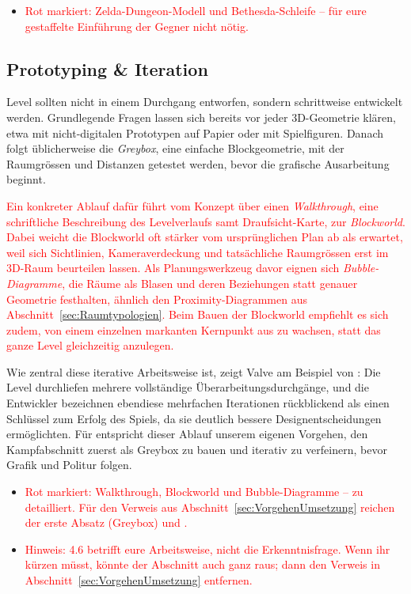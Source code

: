 \documentclass[../Main.tex]{subfiles}
\begin{document}
\begin{itemize}[leftmargin=1.5cm]
    \item \textcolor{red}{Rot markiert: Zelda-Dungeon-Modell und Bethesda-Schleife -- für eure gestaffelte Einführung der Gegner nicht nötig.}
\end{itemize}

\subsection{Prototyping \& Iteration} \label{sec:Prototyping}
Level sollten nicht in einem Durchgang entworfen, sondern schrittweise entwickelt werden. Grundlegende Fragen lassen sich bereits vor jeder 3D-Geometrie klären, etwa mit nicht-digitalen Prototypen auf Papier oder mit Spielfiguren. Danach folgt üblicherweise die \textit{Greybox}, eine einfache Blockgeometrie, mit der Raumgrössen und Distanzen getestet werden, bevor die grafische Ausarbeitung beginnt.\autocite[124--126]{totten2014architectural}

\textcolor{red}{Ein konkreter Ablauf dafür führt vom Konzept über einen \textit{Walkthrough}, eine schriftliche Beschreibung des Levelverlaufs samt Draufsicht-Karte, zur \textit{Blockworld}. Dabei weicht die Blockworld oft stärker vom ursprünglichen Plan ab als erwartet, weil sich Sichtlinien, Kameraverdeckung und tatsächliche Raumgrössen erst im 3D-Raum beurteilen lassen. Als Planungswerkzeug davor eignen sich \textit{Bubble-Diagramme}, die Räume als Blasen und deren Beziehungen statt genauer Geometrie festhalten, ähnlich den Proximity-Diagrammen aus Abschnitt~\ref{sec:Raumtypologien}. Beim Bauen der Blockworld empfiehlt es sich zudem, von einem einzelnen markanten Kernpunkt aus zu wachsen, statt das ganze Level gleichzeitig anzulegen.\autocite{gdc_leveldesignaday2020}}

Wie zentral diese iterative Arbeitsweise ist, zeigt Valve am Beispiel von \autocite{valve_halflife2_2004}: Die Level durchliefen mehrere vollständige Überarbeitungsdurchgänge, und die Entwickler bezeichnen ebendiese mehrfachen Iterationen rückblickend als einen Schlüssel zum Erfolg des Spiels, da sie deutlich bessere Designentscheidungen ermöglichten.\autocite{jacobson2005postmortem} Für  entspricht dieser Ablauf unserem eigenen Vorgehen, den Kampfabschnitt zuerst als Greybox zu bauen und iterativ zu verfeinern, bevor Grafik und Politur folgen.

\begin{itemize}[leftmargin=1.5cm]
    \item \textcolor{red}{Rot markiert: Walkthrough, Blockworld und Bubble-Diagramme -- zu detailliert. Für den Verweis aus Abschnitt~\ref{sec:VorgehenUmsetzung} reichen der erste Absatz (Greybox) und .}
    \item \textcolor{red}{Hinweis: 4.6 betrifft eure Arbeitsweise, nicht die Erkenntnisfrage. Wenn ihr kürzen müsst, könnte der Abschnitt auch ganz raus; dann den Verweis in Abschnitt~\ref{sec:VorgehenUmsetzung} entfernen.}
\end{itemize}
\end{document}
